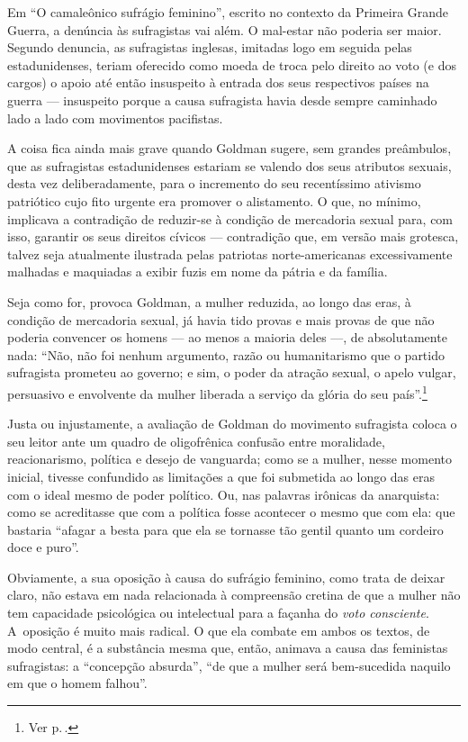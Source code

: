 Em ``O camaleônico sufrágio feminino'', escrito no contexto da Primeira
Grande Guerra, a denúncia às sufragistas vai além. O mal-estar não
poderia ser maior. Segundo denuncia, as sufragistas inglesas, imitadas
logo em seguida pelas estadunidenses, teriam oferecido como moeda de
troca pelo direito ao voto (e dos cargos) o apoio até então insuspeito à
entrada dos seus respectivos países na guerra --- insuspeito porque
a causa sufragista havia desde sempre caminhado lado a lado com movimentos
pacifistas.

A coisa fica ainda mais grave quando
Goldman sugere, sem grandes preâmbulos,
que as sufragistas estadunidenses estariam se valendo dos seus atributos sexuais, desta vez
deliberadamente, para o incremento do seu recentíssimo ativismo
patriótico cujo fito urgente era promover o alistamento. O
que, no mínimo, implicava a contradição de reduzir-se à condição de
mercadoria sexual para, com isso, garantir os seus direitos cívicos ---
contradição que, em versão mais grotesca, talvez seja atualmente
ilustrada pelas patriotas norte-americanas excessivamente malhadas e
maquiadas a exibir fuzis em nome da pátria e da família.

Seja
como for, provoca Goldman, a mulher reduzida, ao
longo das eras, à condição de mercadoria sexual, já havia tido provas e
mais provas de que não poderia convencer os homens --- ao menos a maioria
deles ---, de absolutamente nada: ``Não, não foi nenhum argumento, razão ou humanitarismo que o partido sufragista prometeu ao governo; e sim, o poder da atração
sexual, o apelo vulgar, persuasivo e envolvente da mulher liberada a
serviço da glória do seu país''.\footnote{Ver p.\,\pageref{argumento}.}

Justa ou injustamente, a avaliação de Goldman do movimento sufragista
coloca o seu leitor ante um quadro de oligofrênica confusão entre
moralidade, reacionarismo, política e desejo de vanguarda; como se a
mulher, nesse momento inicial, tivesse confundido as limitações a que
foi submetida ao longo das eras com o ideal mesmo de poder político. Ou,
nas palavras irônicas da anarquista: como se acreditasse que com a
política fosse acontecer o mesmo que com ela: que bastaria ``afagar a
besta para que ela se tornasse tão gentil quanto um cordeiro doce e
puro''.

Obviamente, a sua oposição à causa do sufrágio feminino, como
trata de deixar claro, não estava em nada relacionada à compreensão
cretina de que a mulher não tem capacidade psicológica ou intelectual
para a façanha do \textit{voto consciente}. A~oposição é muito mais
radical. O que ela combate em ambos os textos, de modo central, é a
substância mesma que, então, animava a causa das feministas sufragistas:
a ``concepção absurda'', ``de que a mulher será bem-sucedida naquilo em
que o homem falhou''.

